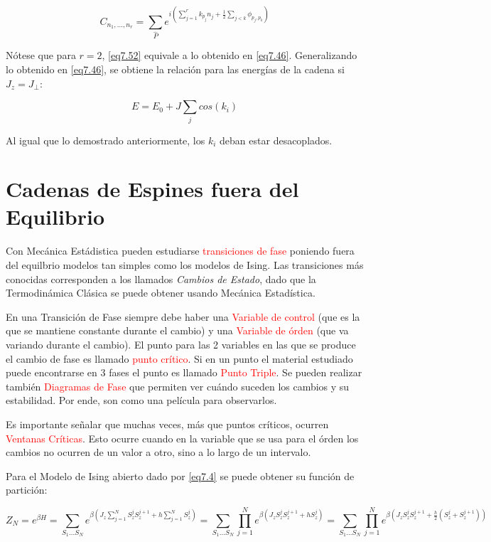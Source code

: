 \documentclass{book}
\begin{document}
\begin{equation}\label{eq7.52}C_{n_1,...,n_r}=\sum_{\hat{P}}e^{i(\sum_{j=1}^r k_{p_j}n_j+\frac{1}{2}\sum_{j<k}\phi_{p_j,p_k})}\end{equation}

Nótese que para $r=2$, \ref{eq7.52} equivale a lo obtenido en \ref{eq7.46}. Generalizando lo obtenido en \ref{eq7.46}, se obtiene la relación para las energías de la cadena si $J_z=J_\perp$:

\begin{equation}\label{eq7.53}E=E_0+J\sum_j cos(k_i)\end{equation}

Al igual que lo demostrado anteriormente, los $k_i$ deban estar desacoplados. 

\section{Cadenas de Espines fuera del Equilibrio}

Con Mecánica Estádistica pueden estudiarse \textcolor{red}{transiciones de fase} poniendo fuera del equilbrio modelos tan simples como los modelos de Ising. Las transiciones más conocidas corresponden a los llamados \textit{Cambios de Estado}, dado que la Termodinámica Clásica se puede obtener usando Mecánica Estadística.

En una Transición de Fase siempre debe haber una \textcolor{red}{Variable de control} (que es la que se mantiene constante durante el cambio) y una \textcolor{red}{Variable de órden} (que va variando durante el cambio). El punto para las 2 variables en las que se produce el cambio de fase es llamado \textcolor{red}{punto crítico}. Si en un punto el material estudiado puede encontrarse en 3 fases el punto es llamado \textcolor{red}{Punto Triple}. Se pueden realizar también \textcolor{red}{Diagramas de Fase} que permiten ver cuándo suceden los cambios y su estabilidad. Por ende, son como una película para observarlos. 

Es importante señalar que muchas veces, más que puntos críticos, ocurren \textcolor{red}{Ventanas Críticas}. Esto ocurre cuando en la variable que se usa para el órden los cambios no ocurren de un valor a otro, sino a lo largo de un intervalo.

Para el Modelo de Ising abierto dado por \ref{eq7.4} se puede obtener su función de partición:

\begin{equation}\label{eq7.54}Z_N=e^{\beta H}=\sum_{S_1...S_N}e^{\beta(J_z\sum_{j=1}^N S_z^jS_z^{j+1}+h\sum_{j=1}^N S^j_z)}=\sum_{S_1...S_N}\prod_{j=1}^N e^{\beta (J_z S_z^j S_z^{j+1}+hS_z^j)}=\sum_{S_1...S_N}\prod_{j=1}^N e^{\beta (J_z S_z^j S_z^{j+1}+\frac{h}{2}(S_z^j+S_z^{j+1}))}\end{equation}
\end{document}
